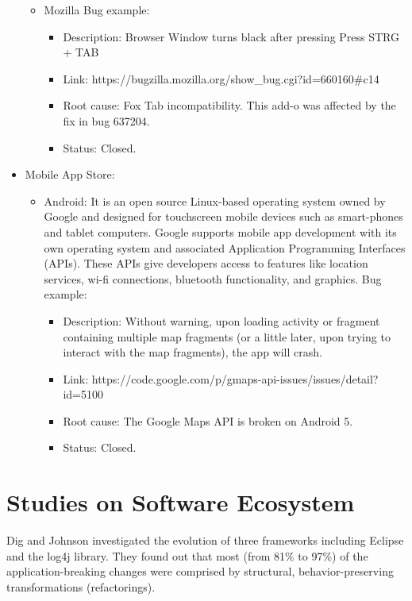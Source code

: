 \begin{itemize}
\begin{itemize}
\begin{itemize}
    \end{itemize}
    \item Mozilla Bug example:
    \begin{itemize}
      \item Description: Browser Window turns black after pressing Press STRG
      + TAB
      \item Link: https://bugzilla.mozilla.org/show\_bug.cgi?id=660160\#c14
      \item Root cause:  Fox Tab incompatibility. This add-o was affected by the
      fix in bug 637204.
      \item Status: Closed.
    \end{itemize}
  \end{itemize}
  
  \item Mobile App Store:
  \begin{itemize}
    \item Android: It is an open source Linux-based operating system owned by
    Google and designed for touchscreen mobile devices such as smart-phones and
    tablet computers. Google supports mobile app development with
    its own operating system and associated Application
    Programming Interfaces (APIs). These APIs give developers
    access to features like location services, wi-fi connections,
    bluetooth functionality, and graphics. Bug example:
    \begin{itemize}
      \item Description: Without warning, upon loading activity or fragment
      containing multiple map fragments (or a little later, upon trying to
      interact with the map fragments),  the app will crash.
      
      
      \item Link: https://code.google.com/p/gmaps-api-issues/issues/detail?id=5100
      \item Root cause:  The Google Maps API is broken on Android 5.
      \item Status: Closed.
    \end{itemize}
  \end{itemize}
  
\end{itemize}
\section{Studies on Software Ecosystem} 

Dig and Johnson \cite{dig_role_2005} investigated the evolution of three
frameworks including Eclipse and the log4j library. They found out that most
(from 81\% to 97\%) of the application-breaking changes were comprised
by structural, behavior-preserving transformations (refactorings).

